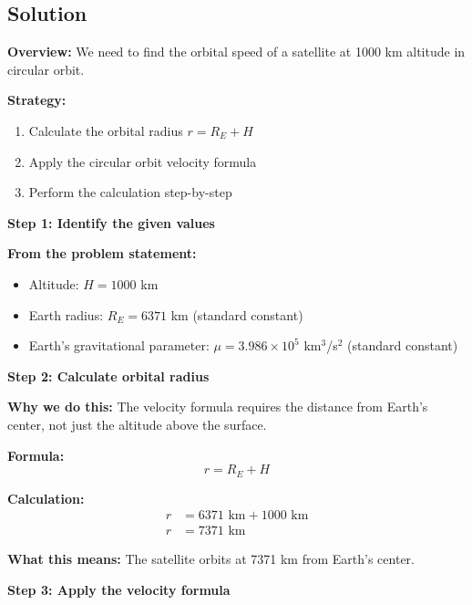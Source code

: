 \documentclass[11pt,letterpaper]{article}
\begin{document}
\subsection{Solution}

\textbf{Overview:} We need to find the orbital speed of a satellite at 1000 km altitude in circular orbit.

\textbf{Strategy:}
\begin{enumerate}
    \item Calculate the orbital radius $r = R_E + H$
    \item Apply the circular orbit velocity formula
    \item Perform the calculation step-by-step
\end{enumerate}

\vspace{0.3cm}

\textbf{Step 1: Identify the given values}

\textbf{From the problem statement:}
\begin{itemize}
    \item Altitude: $H = 1000$ km
    \item Earth radius: $R_E = 6371$ km (standard constant)
    \item Earth's gravitational parameter: $\mu = 3.986 \times 10^5$ km$^3$/s$^2$ (standard constant)
\end{itemize}

\vspace{0.3cm}

\textbf{Step 2: Calculate orbital radius}

\textbf{Why we do this:} The velocity formula requires the distance from Earth's center, not just the altitude above the surface.

\textbf{Formula:}
\begin{equation}
r = R_E + H
\end{equation}

\textbf{Calculation:}
\begin{align}
r &= 6371 \text{ km} + 1000 \text{ km} \\
r &= 7371 \text{ km}
\end{align}

\textbf{What this means:} The satellite orbits at 7371 km from Earth's center.

\vspace{0.3cm}

\textbf{Step 3: Apply the velocity formula}
\end{document}
